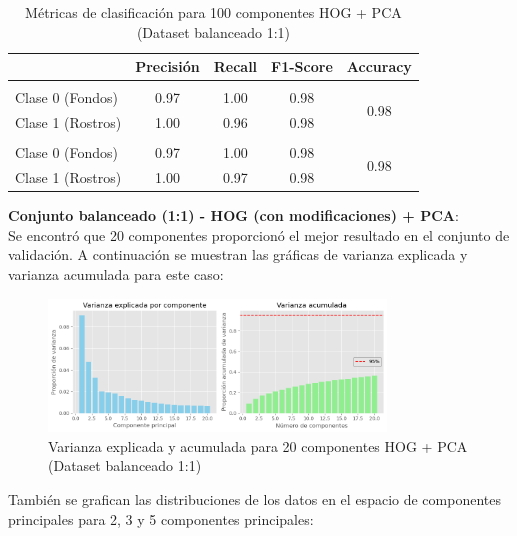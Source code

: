 \documentclass{article}
\begin{document}
\begin{table}[H]
    \centering
    \begin{tabular}{|>{\centering\arraybackslash}m{3.2cm}|c|c|c|c|}
    \hline
    \rowcolor{tableblue} \multicolumn{1}{|c|}{\textbf{Conjunto}} & \textbf{Precisión} & \textbf{Recall} & \textbf{F1-Score} & \textbf{Accuracy} \\
    \hline
    \multicolumn{5}{|c|}{\textbf{Entrenamiento}} \\
    \hline
    Clase 0 (Fondos) & 0.97 & 1.00 & 0.98 & \multirow{2}{*}{0.98} \\
    Clase 1 (Rostros) & 1.00 & 0.96 & 0.98 & \\
    \hline
    \multicolumn{5}{|c|}{\textbf{Validación}} \\
    \hline
    Clase 0 (Fondos) & 0.97 & 1.00 & 0.98 & \multirow{2}{*}{0.98} \\
    Clase 1 (Rostros) & 1.00 & 0.97 & 0.98 & \\
    \hline
    \end{tabular}
    \caption{Métricas de clasificación para 100 componentes HOG + PCA (Dataset balanceado 1:1)}
    \label{tab:hog_pca_x1_metrics}
\end{table}

\textbf{Conjunto balanceado (1:1) - HOG (con modificaciones) + PCA}:\\

Se encontró que 20 componentes proporcionó el mejor resultado en el conjunto de validación. A continuación se muestran las gráficas de varianza explicada y varianza acumulada para este caso:

\begin{figure}[H]
    \centering
    \includegraphics[width=0.8\textwidth]{tarea_4/imagenes/variance_x1_v1_20.png}
    \caption{Varianza explicada y acumulada para 20 componentes HOG + PCA (Dataset balanceado 1:1)}
    \label{fig:hog_pca_variance_x1}
\end{figure}

También se grafican las distribuciones de los datos en el espacio de componentes principales para 2, 3 y 5 componentes principales:
\end{document}
